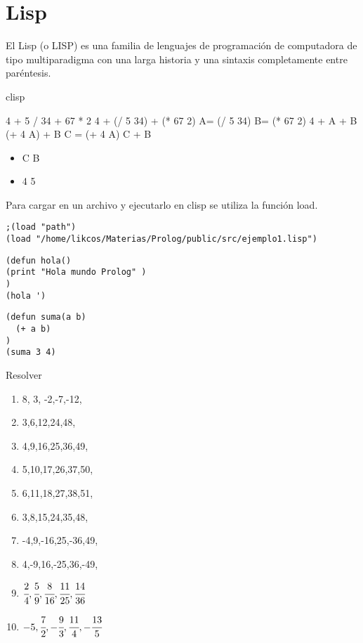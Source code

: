 \documentclass[11pt]{article}
\begin{document}
\section*{Lisp}
\label{sec:org53678f5}
El Lisp (o LISP) es una familia de lenguajes de programación de
computadora de tipo multiparadigma con una larga historia y una
sintaxis completamente entre paréntesis.

clisp

4 + 5 / 34 + 67 * 2 
4 + (/ 5 34) + (* 67 2)
A= (/ 5 34)
B= (* 67 2)
4 + A + B
(+ 4 A) + B
C = (+ 4 A)
C + B
\begin{itemize}
\item C B
\item 4 5
\end{itemize}

Para cargar en un archivo y ejecutarlo en clisp se utiliza la función load. 

\begin{verbatim}
;(load "path")
(load "/home/likcos/Materias/Prolog/public/src/ejemplo1.lisp")
\end{verbatim}

\begin{verbatim}
(defun hola()
(print "Hola mundo Prolog" )
)
(hola ')
\end{verbatim}




\begin{verbatim}
(defun suma(a b)
  (+ a b)
)
(suma 3 4)

\end{verbatim}

Resolver 

\begin{enumerate}
\item 8, 3, -2,-7,-12,
\item 3,6,12,24,48,
\item 4,9,16,25,36,49,
\item 5,10,17,26,37,50,
\item 6,11,18,27,38,51,
\item 3,8,15,24,35,48,
\item -4,9,-16,25,-36,49,
\item 4,-9,16,-25,36,-49,
\item \(\cfrac{2}{4},\cfrac{5}{9},\cfrac{8}{16},\cfrac{11}{25},\cfrac{14}{36}\)
\item \(-5,\cfrac{7}{2},-\cfrac{9}{3},\cfrac{11}{4},-\cfrac{13}{5}\)
\end{enumerate}
\end{document}
